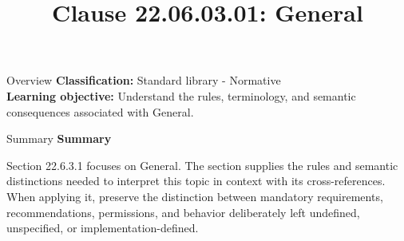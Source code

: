 \documentclass[10pt,letterpaper]{article}
\title{Clause 22.06.03.01: General}
\author{}
\date{}
\begin{document}
\maketitle
\begin{CornellOverviewBox}{Overview}
\textbf{Classification:} Standard library - Normative\\[2pt]
\textbf{Learning objective:} Understand the rules, terminology, and semantic consequences associated with General.
\end{CornellOverviewBox}\begin{CornellSummaryBox}{Summary}
{\sffamily\bfseries\color{Accent} Summary}\par\vspace{3pt}Section 22.6.3.1 focuses on General. The section supplies the rules and semantic distinctions needed to interpret this topic in context with its cross-references. When applying it, preserve the distinction between mandatory requirements, recommendations, permissions, and behavior deliberately left undefined, unspecified, or implementation-defined.
\end{CornellSummaryBox}
\end{document}
